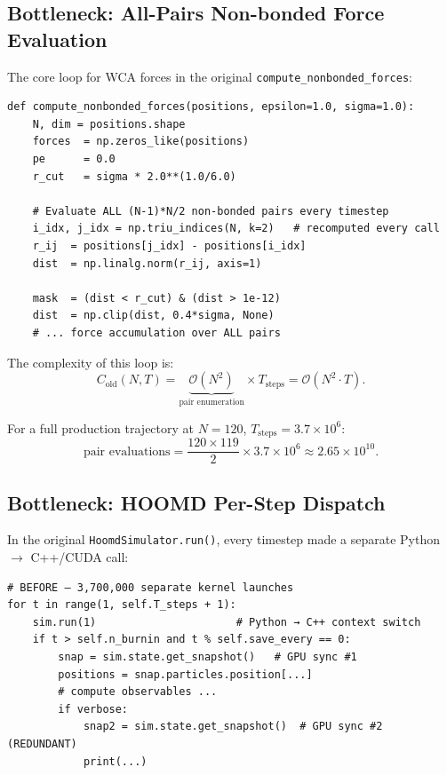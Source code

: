 \documentclass[12pt,a4paper]{article}
\newcommand{\Obig}[1]{\mathcal{O}\!\left(#1\right)}
\newcommand{\code}[1]{\texttt{#1}}
\begin{document}
\subsection{Bottleneck: All-Pairs Non-bonded Force Evaluation}
\label{sec:old-nb}

The core loop for WCA forces in the original \code{compute\_nonbonded\_forces}:

\begin{lstlisting}[caption={Original all-pairs WCA loop (pre-optimization).},label={lst:old-nb}]
def compute_nonbonded_forces(positions, epsilon=1.0, sigma=1.0):
    N, dim = positions.shape
    forces  = np.zeros_like(positions)
    pe      = 0.0
    r_cut   = sigma * 2.0**(1.0/6.0)

    # Evaluate ALL (N-1)*N/2 non-bonded pairs every timestep
    i_idx, j_idx = np.triu_indices(N, k=2)   # recomputed every call
    r_ij  = positions[j_idx] - positions[i_idx]
    dist  = np.linalg.norm(r_ij, axis=1)

    mask  = (dist < r_cut) & (dist > 1e-12)
    dist  = np.clip(dist, 0.4*sigma, None)
    # ... force accumulation over ALL pairs
\end{lstlisting}

The complexity of this loop is:
\begin{equation}
  C_\text{old}(N, T) = \underbrace{\Obig{N^2}}_{\text{pair enumeration}} \times T_\text{steps}
  = \Obig{N^2 \cdot T}.
\end{equation}

For a full production trajectory at $N=120$, $T_\text{steps}=3.7\times10^6$:
\[
  \text{pair evaluations} = \frac{120 \times 119}{2} \times 3.7\times10^6 \approx 2.65\times10^{10}.
\]

\subsection{Bottleneck: HOOMD Per-Step Dispatch}
\label{sec:old-hoomd}

In the original \code{HoomdSimulator.run()}, every timestep made a separate Python $\to$ C++/CUDA call:

\begin{lstlisting}[caption={Original per-step HOOMD dispatch.},label={lst:old-hoomd}]
# BEFORE — 3,700,000 separate kernel launches
for t in range(1, self.T_steps + 1):
    sim.run(1)                      # Python → C++ context switch
    if t > self.n_burnin and t % self.save_every == 0:
        snap = sim.state.get_snapshot()   # GPU sync #1
        positions = snap.particles.position[...]
        # compute observables ...
        if verbose:
            snap2 = sim.state.get_snapshot()  # GPU sync #2 (REDUNDANT)
            print(...)
\end{lstlisting}
\end{document}
